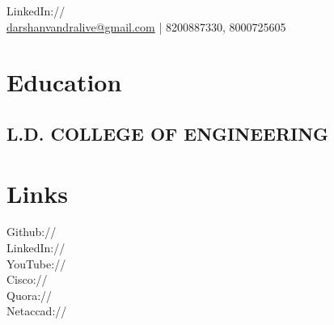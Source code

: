 \documentclass[]{deedy-resume-openfont}
\begin{document}
%
%
\lastupdated

%
%


{ LinkedIn://  \href{https://www.linkedin.com/in/darshan-vandra-47176ba9}{} \\
\href{mailto:darshanvandralive@gmail.com}{darshanvandralive@gmail.com} | 8200887330, 8000725605
}

%
%

\begin{minipage}[t]{0.33\textwidth} 


\section{Education} 

\subsection{L.D. COLLEGE OF ENGINEERING}



\section{Links} 
Github:// \href{https://github.com/Darshan-excellence}{} \\
LinkedIn://  \href{https://www.linkedin.com/in/darshan-vandra-47176ba9}{} \\
YouTube://  \href{https://www.youtube.com/channel/UCJ7Pny3uzjD0dqwvX8pMTeA/playlists?view_as=subscriber}{} \\
Cisco://  \href{https://learningnetwork.cisco.com/people/darshanvandralive%40gmail.com}{\custombold{@darshanvandra}} \\
Quora://  \href{https://www.quora.com/DARSHAN-VANDRA}{} \\
Netaccad://  \href{https://www.netacad.com/group/landing/edit-user-profile?p_p_id=netacaduserprofile_WAR_netacaduserprofileportlet&p_p_lifecycle=0&p_p_state=maximized&p_p_mode=view&_netacaduserprofile_WAR_netacaduserprofileportlet_pageName=UserDetails}{}



\end{minipage}
\end{document}

